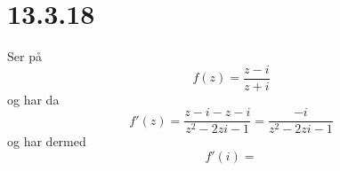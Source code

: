 \documentclass{report}
\begin{document}
\section*{13.3.18}
Ser på
\begin{equation}
  \label{eq:23}
  f(z) = \frac{z-i}{z+i}
\end{equation}
og har da
\begin{equation}
  \label{eq:24}
  f'(z) = \frac{z - i - z - i}{z^{2} - 2zi - 1} = \frac{-i}{z^{2}-2zi-1}
\end{equation}
og har dermed
\begin{equation}
  \label{eq:25}
  f'(i) =
\end{equation}
\end{document}
